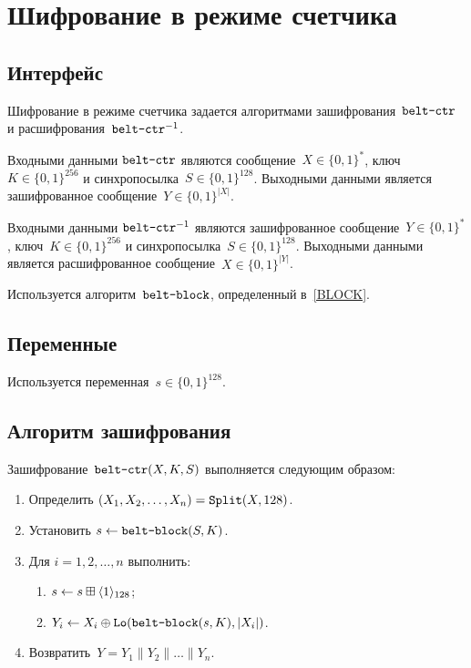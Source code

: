 \section{Шифрование в режиме счетчика}\label{CTR}

\subsection{Интерфейс}\label{CTR.IFace}

Шифрование в режиме счетчика задается алгоритмами 
зашифрования~$\texttt{belt-ctr}$ и расшифрования~$\texttt{belt-ctr}^{-1}$.

Входными данными $\texttt{belt-ctr}$ являются сообщение~$X\in\{0,1\}^*$, 
ключ~$K\in\{0,1\}^{256}$ и синхропосылка~$S\in\{0,1\}^{128}$.
%
Выходными данными является зашифрованное сообщение~$Y\in\{0,1\}^{|X|}$.

Входными данными $\texttt{belt-ctr}^{-1}$ являются зашифрованное 
сообщение~$Y\in\{0,1\}^*$, ключ~$K\in\{0,1\}^{256}$ и 
синхропосылка~$S\in\{0,1\}^{128}$. 
%
Выходными данными является расшифрованное сообщение~$X\in\{0,1\}^{|Y|}$.

Используется алгоритм~$\texttt{belt-block}$, определенный в~\ref{BLOCK}.

\subsection{Переменные}\label{CTR.Vars}

Используется переменная~$s\in\{0,1\}^{128}$.

\subsection{Алгоритм зашифрования}\label{CTR.Encr}

Зашифрование~$\texttt{belt-ctr}(X,K,S)$ выполняется следующим образом:
\begin{enumerate}
\item
Определить $(X_1,X_2,\ldots,X_n)=\mathop{\texttt{Split}}\nolimits(X,128)$.
\item
Установить 
$s\leftarrow \texttt{belt-block}(S,K)$.
\item
Для $i=1,2,\ldots,n$ выполнить:
\begin{enumerate}
\item
$s\leftarrow s\boxplus\langle1\rangle_{128}$;
\item
$Y_i\leftarrow X_i\oplus\mathop{\texttt{Lo}}\nolimits(\texttt{belt-block}(s,K),|X_i|)$.
\end{enumerate}
\item
Возвратить~$Y=Y_1\parallel Y_2\parallel\ldots\parallel Y_n$.
\end{enumerate}

